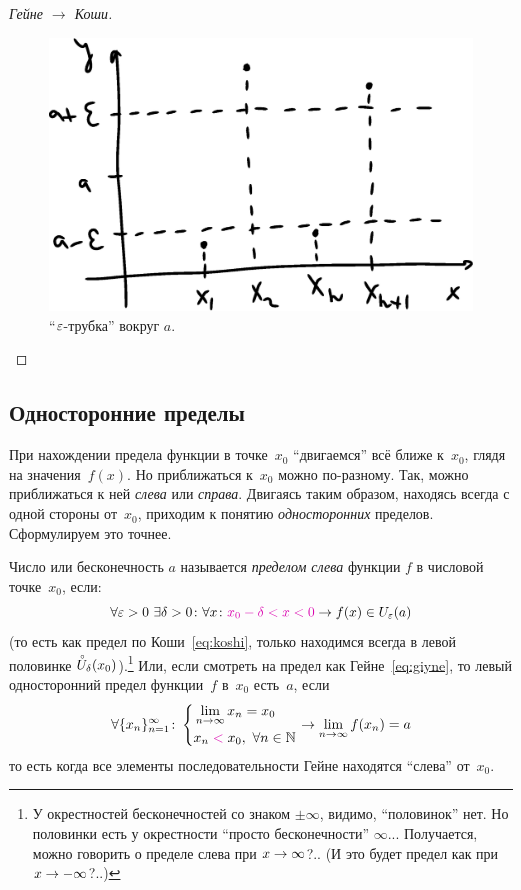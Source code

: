\documentclass[a4paper,12pt]{article}
\renewcommand{\mathring}[1]{\accentset{\circ}{#1}}
\begin{document}
\begin{proof}[Гейне $\to$ Коши]
    \begin{figure}[ht]
      \centering
      \includegraphics[width=0.6\linewidth]{images/tube}
    
      \caption{
        ``$\varepsilon$-трубка'' вокруг $a$.
      }
      \label{fig:tube}
    \end{figure}
  \end{proof}


  \subsection{Односторонние пределы}


  При нахождении предела функции в точке~$x_0$ ``двигаемся'' всё ближе к~$x_0$, глядя на значения~$f(x)$.
  Но приближаться к~$x_0$ можно по-разному.
  Так, можно приближаться к ней \emph{слева} или \emph{справа}.
  Двигаясь таким образом, находясь всегда с одной стороны от~$x_0$, приходим к понятию \emph{односторонних} пределов.
  Сформулируем это точнее.
  
  Число или бесконечность $a$ называется \emph{пределом слева} функции $f$ в числовой точке~$x_0$, если:
  \[
    \forall \eps > 0\ \exists \delta > 0\colon \forall x\colon \textcolor{pink}{x_0 - \delta < x < 0} \to f(x) \in U_{\eps}(a)
  \]
  (то есть как предел по Коши~\eqref{eq:koshi}, только находимся всегда в левой половинке $\mathring U_{\delta}(x_0)$).\footnote{
    У окрестностей бесконечностей со знаком $\pm \infty$, видимо, ``половинок'' нет.
    Но половинки есть у окрестности ``просто бесконечности'' $\infty$...
    Получается, можно говорить о пределе слева при $x \hm\to \infty$?..
    (И это будет предел как при $x \hm\to -\infty$?..)
  }
  Или, если смотреть на предел как Гейне~\eqref{eq:giyne}, то левый односторонний предел функции~$f$ в~$x_0$ есть~$a$, если
  \[
    \forall \{x_n\}_{n=1}^{\infty}\colon \left\{
      \begin{aligned}
        &\lim_{n \to \infty} x_n = x_0\\
        &x_n \textcolor{pink}{{}<{}} x_0,\ \forall n \in \NN
      \end{aligned}
    \right.
    \to \lim_{n \to \infty} f(x_n) = a
  \]
  то есть когда все элементы последовательности Гейне находятся ``слева'' от~$x_0$.
\end{document}
